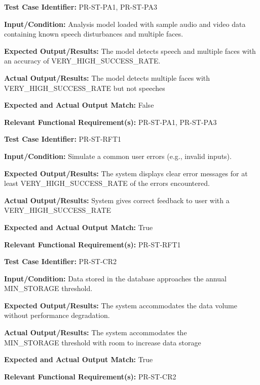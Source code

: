 \documentclass[12pt, titlepage]{article}
\begin{document}
\begin{mdframed}[linewidth=0.5mm]
  \textbf{Test Case Identifier:} PR-ST-PA1, PR-ST-PA3 \par
  \textbf{Input/Condition:} Analysis model loaded with sample audio and video data containing known speech disturbances and multiple faces. \par
  \textbf{Expected Output/Results:} The model detects speech and multiple faces with an accuracy of VERY\_HIGH\_SUCCESS\_RATE. \par
  \textbf{Actual Output/Results:} The model detects multiple faces with \\VERY\_HIGH\_SUCCESS\_RATE but not speeches \par
  \textbf{Expected and Actual Output Match:} False \par
  \textbf{Relevant Functional Requirement(s):} PR-ST-PA1, PR-ST-PA3
\end{mdframed}

\begin{mdframed}[linewidth=0.5mm]
  \textbf{Test Case Identifier:} PR-ST-RFT1 \par
  \textbf{Input/Condition:} Simulate a common user errors (e.g., invalid inputs). \par
  \textbf{Expected Output/Results:} The system displays clear error messages for at least VERY\_HIGH\_SUCCESS\_RATE of the errors encountered. \par
  \textbf{Actual Output/Results:} System gives correct feedback to user with a VERY\_HIGH\_SUCCESS\_RATE \par
  \textbf{Expected and Actual Output Match:} True \par
  \textbf{Relevant Functional Requirement(s):} PR-ST-RFT1
\end{mdframed}

\begin{mdframed}[linewidth=0.5mm]
  \textbf{Test Case Identifier:} PR-ST-CR2 \par
  \textbf{Input/Condition:} Data stored in the database approaches the annual MIN\_STORAGE threshold. \par
  \textbf{Expected Output/Results:} The system accommodates the data volume without performance degradation. \par
  \textbf{Actual Output/Results:} The system accommodates the \\MIN\_STORAGE threshold with room to increase data storage\par
  \textbf{Expected and Actual Output Match:} True \par
  \textbf{Relevant Functional Requirement(s):} PR-ST-CR2
\end{mdframed}
\end{document}
